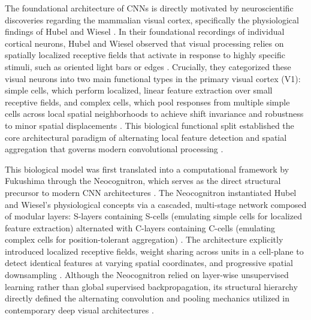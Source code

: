 The foundational architecture of CNNs is directly motivated by neuroscientific discoveries regarding the mammalian visual cortex, specifically the physiological findings of Hubel and Wiesel \parencite{hubel_receptive_1962, Goodfellow-et-al-2016}. In their foundational recordings of individual cortical neurons, Hubel and Wiesel observed that visual processing relies on spatially localized receptive fields that activate in response to highly specific stimuli, such as oriented light bars or edges \parencite{hubel_receptive_1962, Goodfellow-et-al-2016}. Crucially, they categorized these visual neurons into two main functional types in the primary visual cortex (V1): simple cells, which perform localized, linear feature extraction over small receptive fields, and complex cells, which pool responses from multiple simple cells across local spatial neighborhoods to achieve shift invariance and robustness to minor spatial displacements \parencite{Goodfellow-et-al-2016, scherer_evaluation_2010}. This biological functional split established the core architectural paradigm of alternating local feature detection and spatial aggregation that governs modern convolutional processing \parencite{Goodfellow-et-al-2016, scherer_evaluation_2010, lecun_gradient-based_1998}.

This biological model was first translated into a computational framework by Fukushima through the Neocognitron, which serves as the direct structural precursor to modern CNN architectures \parencite{fukushima_neocognitron_1980, scherer_evaluation_2010, lecun_gradient-based_1998}. The Neocognitron instantiated Hubel and Wiesel's physiological concepts via a cascaded, multi-stage network composed of modular layers: S-layers containing S-cells (emulating simple cells for localized feature extraction) alternated with C-layers containing C-cells (emulating complex cells for position-tolerant aggregation) \parencite{fukushima_neocognitron_1980}. The architecture explicitly introduced localized receptive fields, weight sharing across units in a cell-plane to detect identical features at varying spatial coordinates, and progressive spatial downsampling \parencite{fukushima_neocognitron_1980}. Although the Neocognitron relied on layer-wise unsupervised learning rather than global supervised backpropagation, its structural hierarchy directly defined the alternating convolution and pooling mechanics utilized in contemporary deep visual architectures \parencite{fukushima_neocognitron_1980, Goodfellow-et-al-2016, lecun_gradient-based_1998}.

